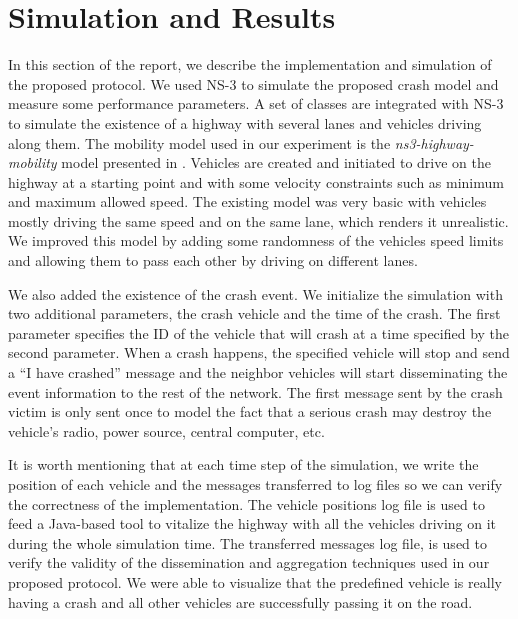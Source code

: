 \documentclass{IEEEtran}
\begin{document}
\section{Simulation and Results}
In this section of the report, we describe the implementation and simulation of the proposed protocol.
We used NS-3 \cite{ns3} to simulate the proposed crash model and measure some performance parameters. A set of classes are integrated with NS-3 to simulate the existence of a highway with several lanes and vehicles driving along them. The mobility model used in our experiment is the \emph{ns3-highway-mobility} model presented in \cite{highway-mobility}.
Vehicles are created and initiated to drive on the highway at a starting point and with some velocity constraints such as minimum and maximum allowed speed. The existing model was very basic with vehicles mostly driving the same speed and on the same lane, which renders it unrealistic. We improved this model by adding some randomness of the vehicles speed limits and allowing them to pass each other by driving on different lanes.

We also added the existence of the crash event. We initialize the simulation with two additional parameters, the crash vehicle and the time of the crash. The first parameter specifies the ID of the vehicle that will crash at a time specified by the second parameter.
When a crash happens, the specified vehicle will stop and send a ``I have crashed'' message and the neighbor vehicles will start disseminating the event information to the rest of the network.
The first message sent by the crash victim is only sent once to model the fact that a serious crash may destroy the vehicle's radio, power source, central computer, etc.

It is worth mentioning that at each time step of the simulation, we write the position of each vehicle and the messages transferred to log files so we can verify the correctness of the implementation.
The vehicle positions log file is used to feed a Java-based tool to vitalize the highway with all the vehicles driving on it during the whole simulation time.
The transferred messages log file, is used to verify the validity of the dissemination and aggregation techniques used in our proposed protocol.
We were able to visualize that the predefined vehicle is really having a crash and all other vehicles are successfully passing it on the road.
\end{document}
